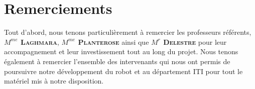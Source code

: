 \chapter{Remerciements}

Tout d'abord, nous tenons particulièrement à remercier les professeurs référents, \textbf{$M^{me}$ \textsc{Laghmara}}, \textbf{$M^{me}$ \textsc{Planterose}} ainsi que \textbf{$M^{r}$ \textsc{Delestre}} pour leur accompagnement et leur investissement tout au long du projet.
Nous tenons également à remercier l'ensemble des intervenants qui nous ont permis de poursuivre notre développement du robot et au département ITI pour tout le matériel mis à notre disposition.



